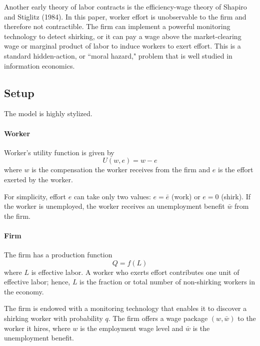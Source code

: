 \documentclass[12pt]{article}
\begin{document}
Another early theory of labor contracts is the efficiency-wage theory of Shapiro and Stiglitz (1984). In this paper, worker effort is unobservable to the firm and therefore not contractible. The firm can implement a powerful monitoring technology to detect shirking, or it can pay a wage above the market-clearing wage or marginal product of labor to induce workers to exert effort. This is a standard hidden-action, or ``moral hazard," problem that is well studied in information economics.

\subsection{Setup}

The model is highly stylized. 

\paragraph{Worker \\ [6pt]}
Worker's utility function is given by 
\begin{equation}
	U(w, e) = w - e
\end{equation} 
where $w$ is the compensation the worker receives from the firm and $e$ is the effort exerted by the worker.

For simplicity, effort $e$ can take only two values: $e = \bar{e}$ (work) or $e = 0$ (shirk). If the worker is unemployed, the worker receives an unemployment benefit $\bar{w}$ from the firm.

\paragraph{Firm \\ [6pt]}

The firm has a production function
\begin{equation}
	Q = f(L)
\end{equation}
where $L$ is effective labor. A worker who exerts effort contributes one unit of effective labor; hence, $L$ is the fraction or total number of non-shirking workers in the economy.
 
The firm is endowed with a monitoring technology that enables it to discover a shirking worker with probability $q$. The firm offers a wage package $(w, \bar{w})$ to the worker it hires, where $w$ is the employment wage level and $\bar{w}$ is the unemployment benefit.
\end{document}
